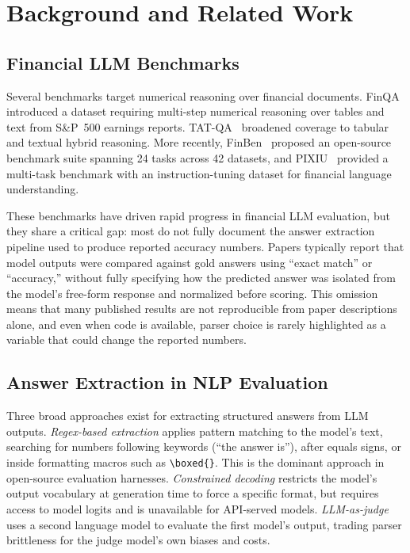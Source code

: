 \section{Background and Related Work}
\label{sec:background}

\subsection{Financial LLM Benchmarks}
\label{sec:financial_benchmarks}

Several benchmarks target numerical reasoning over financial documents. FinQA~\cite{chen2021finqa} introduced a dataset requiring multi-step numerical reasoning over tables and text from S\&P~500 earnings reports. TAT-QA~\cite{zhu2021tatqa} broadened coverage to tabular and textual hybrid reasoning. More recently, FinBen~\cite{xie2024finben} proposed an open-source benchmark suite spanning 24 tasks across 42 datasets, and PIXIU~\cite{xie2023pixiu} provided a multi-task benchmark with an instruction-tuning dataset for financial language understanding.

These benchmarks have driven rapid progress in financial LLM evaluation, but they share a critical gap: most do not fully document the answer extraction pipeline used to produce reported accuracy numbers. Papers typically report that model outputs were compared against gold answers using ``exact match'' or ``accuracy,'' without fully specifying how the predicted answer was isolated from the model's free-form response and normalized before scoring. This omission means that many published results are not reproducible from paper descriptions alone, and even when code is available, parser choice is rarely highlighted as a variable that could change the reported numbers.

\subsection{Answer Extraction in NLP Evaluation}
\label{sec:extraction_methods}

Three broad approaches exist for extracting structured answers from LLM outputs. \textit{Regex-based extraction} applies pattern matching to the model's text, searching for numbers following keywords (``the answer is''), after equals signs, or inside formatting macros such as \verb|\boxed{}|. This is the dominant approach in open-source evaluation harnesses. \textit{Constrained decoding} restricts the model's output vocabulary at generation time to force a specific format, but requires access to model logits and is unavailable for API-served models. \textit{LLM-as-judge}~\cite{zheng2024judging} uses a second language model to evaluate the first model's output, trading parser brittleness for the judge model's own biases and costs.

